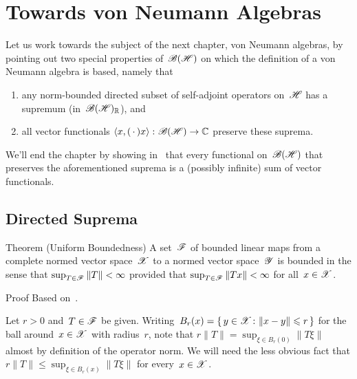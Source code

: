 \documentclass[a]{subfiles}
\begin{document}
\section{Towards von Neumann Algebras}
\begin{parsec}%
\begin{point}%
Let us work towards
the subject of the next chapter, von Neumann algebras,
by pointing out two special properties
of~$\mathscr{B}(\mathscr{H})$
on which the definition of a von Neumann algebra is based,
namely that
\begin{enumerate}
\item
any norm-bounded directed subset of
self-adjoint operators on~$\mathscr{H}$
has a supremum (in~$\mathscr{B}(\mathscr{H})_{\mathbb{R}}$), and
\item
all vector functionals
$\left<x,(\,\cdot\,)x\right>\colon \mathscr{B}(\mathscr{H})\to\mathbb{C}$ 
preserve these suprema.
\end{enumerate}
We'll end
the chapter
by showing
in~
 that every  functional on~$\mathscr{B}(\mathscr{H})$
that  preserves the aforementioned
suprema
is a (possibly infinite) sum of vector functionals.
\end{point}

\subsection{Directed Suprema}
\begin{point}[pub]{Theorem (Uniform Boundedness)}%
%
%
A set~$\mathscr{F}$ of bounded linear maps 
from a complete normed vector space~$\mathscr{X}$
to a normed vector space~$\mathscr{Y}$
is bounded
in the sense that $\sup_{T\in \mathscr{F}} \|T\|<\infty$
provided that 
 $\sup_{T\in \mathscr{F}} \|Tx\|<\infty$
 for all~$x\in \mathscr{X}$.
\begin{point}{Proof}%
Based on~\cite{sokal}.
\begin{point}%
Let $r>0$ and~$T\in\mathscr{F}$ be given.
Writing~$B_r(x)=\{\,y\in\mathscr{X}\colon \|x-y\|\leqslant r\,\}$
for the ball around~$x\in\mathscr{X}$ with radius~$r$,
note that $r\|T\|=\sup_{\xi\in B_r(0)} \|T \xi\|$
almost by definition of the operator norm.
We will need the less obvious fact
that $r\|T\|\leq \sup_{\xi \in B_r(x)}\|T \xi\|$
for every~$x\in \mathscr{X}$.


\end{point}
\end{point}
\end{point}
\end{parsec}
\end{document}
